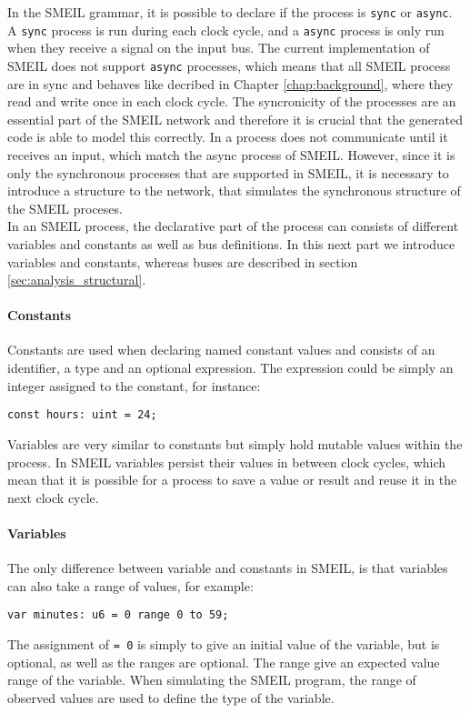 In the SMEIL grammar, it is possible to declare if the process is \texttt{sync} or \texttt{async}. A \texttt{sync} process is run during each clock cycle, and a \texttt{async} process is only run when they receive a signal on the input bus. The current implementation of SMEIL does not support \texttt{async} processes, which means that all SMEIL process are in sync and behaves like decribed in Chapter \ref{chap:background}, where they read and write once in each clock cycle.
The syncronicity of the processes are an essential part of the SMEIL network and therefore it is crucial that the generated code is able to model this correctly. In \cspm{} a process does not communicate until it receives an input, which match the async process of SMEIL. However, since it is only the  synchronous processes that are supported in SMEIL, it is necessary to introduce
a structure to the \cspm network, that simulates the synchronous structure of the SMEIL proceses.
\\

In an SMEIL process, the declarative part of the process can consists of different variables and constants as well as bus definitions. In this next part we introduce variables and constants, whereas buses are described in section \ref{sec:analysis_structural}.
\paragraph{Constants}
Constants are used when declaring named constant values and consists of an identifier, a type and an optional expression. The expression could be simply an integer assigned to the constant, for instance:
\begin{verbatim}
const hours: uint = 24;
\end{verbatim}
Variables are very similar to constants but simply hold mutable values within the process. In SMEIL variables persist their values in between clock cycles, which mean that it is possible for a process to save a value or result and reuse it in the next clock cycle.
\paragraph{Variables}
The only difference between variable and constants in SMEIL, is that variables can also take a range of values, for example:
\begin{verbatim}
var minutes: u6 = 0 range 0 to 59;
\end{verbatim}
The assignment of \texttt{= 0} is simply to give an initial value of the variable, but is optional, as well as the ranges are optional. The range give an expected value range of the variable. When simulating the SMEIL program, the range of observed values are used to define the type of the variable.

